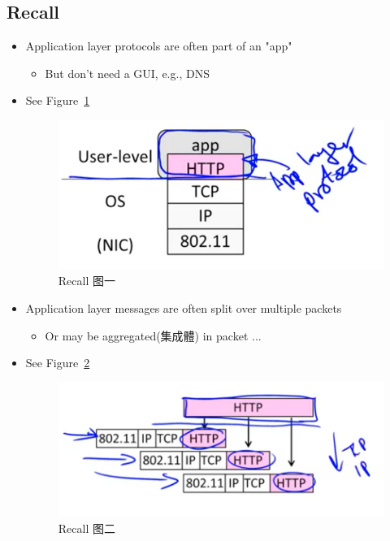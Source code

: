 \documentclass[12pt]{ctexart}   %
\begin{document}
	\subsection{Recall}
	\begin{itemize}
		\item Application layer protocols are often part of an "app"
		\begin{itemize}
			\item But don't need a GUI, e.g., DNS
		\end{itemize}
		\item See Figure~\ref{fig:8-1-1}
		  
		 \begin{figure}[h!] %
		\centering
		 \includegraphics[scale=0.7]{images/8-1-1}
		\caption{ Recall 图一}
		 \label{fig:8-1-1}
		 \end{figure}
		 
		 \item Application layer messages are often split over multiple packets
		 \begin{itemize}
		 	\item Or may be aggregated(集成體) in packet ...
		 \end{itemize}
		 \item See Figure~\ref{fig:8-1-2}
		  
		 \begin{figure}[h!] %
		\centering
		 \includegraphics[scale=0.7]{images/8-1-2}
		\caption{ Recall 图二 }
		 \label{fig:8-1-2}
		 \end{figure}
	\end{itemize}
	
\end{document}
